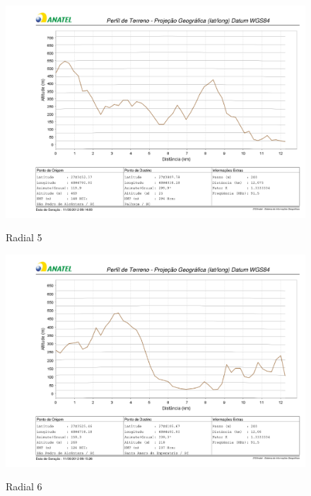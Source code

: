 \begin{figure}[ht] %
\begin{center}
\includegraphics[scale=.5]{./figuras/nmt5_v2.pdf} %

Radial 5
\end{center}
\label{nmt5}
\end{figure}

\begin{figure}[ht] %
\begin{center}
\includegraphics[scale=.5]{./figuras/nmt6_v2.pdf} %

Radial 6
\end{center}
\label{nmt6}
\end{figure}

